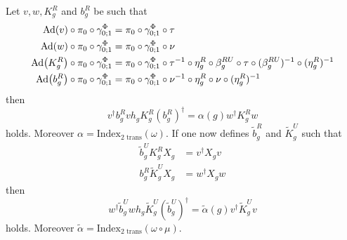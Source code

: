 \documentclass[11pt,a4paper,twoside]{article}
\numberwithin{equation}{section}
\begin{document}
\begin{lemma}
	Let $v,w,K_g^R$ and $b_g^R$ be such that
	\begin{align}
		\Ad{v}\circ\pi_0\circ\gamma^\Phi_{0;1}&=\pi_0\circ\gamma^\Phi_{0;1}\circ\tau\\
		\Ad{w}\circ\pi_0\circ\gamma^\Phi_{0;1}&=\pi_0\circ\gamma^\Phi_{0;1}\circ\nu\\
		\Ad{K_g^R}\circ\pi_0\circ\gamma^\Phi_{0;1}&=\pi_0\circ\gamma^\Phi_{0;1}\circ\tau^{-1}\circ\eta_g^R\circ\beta_g^{RU}\circ\tau\circ(\beta_g^{RU})^{-1}\circ(\eta_g^R)^{-1}\\
		\Ad{b_g^R}\circ\pi_0\circ\gamma^\Phi_{0;1}&=\pi_0\circ\gamma^\Phi_{0;1}\circ\nu^{-1}\circ\eta_g^R\circ\nu\circ(\eta_g^R)^{-1}
	\end{align}
	then
	\begin{equation}\label{eq:H^1IndexRotationInvariantHorizontalIndex}
		v^\dagger b_g^R vh_g K_g^R (b_g^R)^\dagger=\alpha(g)w^\dagger K_g^R w
	\end{equation}
	holds. Moreover $\alpha=\textrm{Index}_{\text{2 trans}}(\omega)$. If one now defines $\tilde{b}_g^R$ and $\tilde{K}_g^U$ such that
	\begin{align}
		\label{eq:H^1IndexRotationInvariantFirstDefinition}
		\tilde{b}_g^UK_g^R X_g&=v^\dagger X_g v\\
		\label{eq:H^1IndexRotationInvariantSecondDefinition}
		b_g^R\tilde{K}_g^UX_g&=w^\dagger X_g w
	\end{align}
	then
	\begin{equation}\label{eq:H^1IndexRotationInvariantVerticalIndex}
		w^\dagger \tilde b_g^U wh_g \tilde K_g^U (\tilde b_g^U)^\dagger=\tilde\alpha(g)v^\dagger \tilde K_g^U v
	\end{equation}
	holds. Moreover $\tilde\alpha=\textrm{Index}_{\text{2 trans}}(\omega\circ\mu)$.
\end{lemma}
\end{document}
